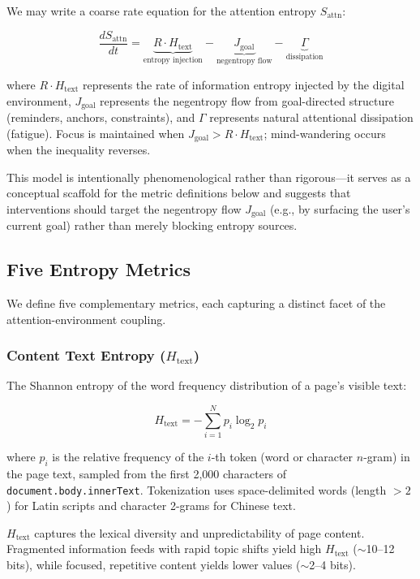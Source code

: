 \documentclass[10pt,letterpaper]{article}
\begin{document}
We may write a coarse rate equation for the attention entropy $S_{\text{attn}}$:

\begin{equation}
\frac{dS_{\text{attn}}}{dt} = \underbrace{R \cdot H_{\text{text}}}_{\text{entropy injection}} - \underbrace{J_{\text{goal}}}_{\text{negentropy flow}} - \underbrace{\Gamma}_{\text{dissipation}}
\label{eq:thermo}
\end{equation}

where $R \cdot H_{\text{text}}$ represents the rate of information entropy injected by the digital environment, $J_{\text{goal}}$ represents the negentropy flow from goal-directed structure (reminders, anchors, constraints), and $\Gamma$ represents natural attentional dissipation (fatigue). Focus is maintained when $J_{\text{goal}} > R \cdot H_{\text{text}}$; mind-wandering occurs when the inequality reverses.

This model is intentionally phenomenological rather than rigorous---it serves as a conceptual scaffold for the metric definitions below and suggests that interventions should target the negentropy flow $J_{\text{goal}}$ (e.g., by surfacing the user's current goal) rather than merely blocking entropy sources.

\subsection{Five Entropy Metrics}

We define five complementary metrics, each capturing a distinct facet of the attention-environment coupling.

\subsubsection{Content Text Entropy ($H_{\text{text}}$)}

The Shannon entropy of the word frequency distribution of a page's visible text:

\begin{equation}
H_{\text{text}} = -\sum_{i=1}^{N} p_i \log_2 p_i
\end{equation}

where $p_i$ is the relative frequency of the $i$-th token (word or character $n$-gram) in the page text, sampled from the first 2,000 characters of \texttt{document.body.innerText}. Tokenization uses space-delimited words (length $> 2$) for Latin scripts and character 2-grams for Chinese text.

$H_{\text{text}}$ captures the lexical diversity and unpredictability of page content. Fragmented information feeds with rapid topic shifts yield high $H_{\text{text}}$ ($\sim$10--12 bits), while focused, repetitive content yields lower values ($\sim$2--4 bits).
\end{document}
